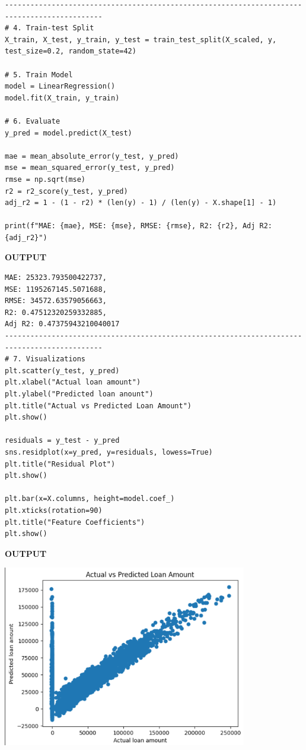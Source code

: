\documentclass[11pt]{article}
\begin{document}
\begin{verbatim}
---------------------------------------------------------------------------------------------
# 4. Train-test Split
X_train, X_test, y_train, y_test = train_test_split(X_scaled, y, test_size=0.2, random_state=42)

# 5. Train Model
model = LinearRegression()
model.fit(X_train, y_train)

# 6. Evaluate
y_pred = model.predict(X_test)

mae = mean_absolute_error(y_test, y_pred)
mse = mean_squared_error(y_test, y_pred)
rmse = np.sqrt(mse)
r2 = r2_score(y_test, y_pred)
adj_r2 = 1 - (1 - r2) * (len(y) - 1) / (len(y) - X.shape[1] - 1)

print(f"MAE: {mae}, MSE: {mse}, RMSE: {rmse}, R2: {r2}, Adj R2: {adj_r2}")
\end{verbatim}
\textbf{OUTPUT}
\begin{verbatim}
MAE: 25323.793500422737, 
MSE: 1195267145.5071688, 
RMSE: 34572.63579056663, 
R2: 0.47512320259332885, 
Adj R2: 0.47375943210040017 
---------------------------------------------------------------------------------------------
# 7. Visualizations
plt.scatter(y_test, y_pred)
plt.xlabel("Actual loan amount")
plt.ylabel("Predicted loan anount")
plt.title("Actual vs Predicted Loan Amount")
plt.show()

residuals = y_test - y_pred
sns.residplot(x=y_pred, y=residuals, lowess=True)
plt.title("Residual Plot")
plt.show()

plt.bar(x=X.columns, height=model.coef_)
plt.xticks(rotation=90)
plt.title("Feature Coefficients")
plt.show()
\end{verbatim}
\textbf{OUTPUT}
\begin{center}
  \includegraphics[width=0.8\textwidth]{sc5.png}
\end{center}
\end{document}
